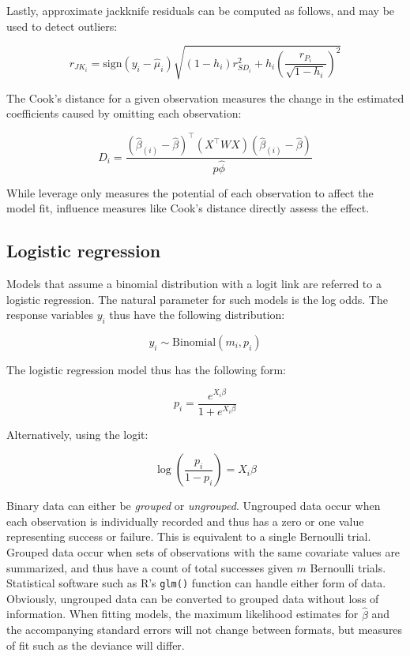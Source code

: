 \documentclass{report}
\begin{document}
Lastly, approximate jackknife residuals can be computed as follows, and may be used to detect outliers:

\begin{equation}\label{eq:glm-resid-jackknife}
    r_{JK_i} = \text{sign}(y_i - \hat{\mu}_i)\sqrt{(1-h_i)r_{SD_i}^2 + h_i\left(\frac{r_{P_i}}{\sqrt{1-h_i}}\right)^2}
\end{equation}

The Cook's distance for a given observation measures the change in the estimated coefficients caused by omitting each observation:

\begin{equation}\label{eq:glm-cooks-distance}
    D_i = \frac{\left(\hat{\beta}_{(i)} - \hat{\beta}\right)^\intercal\left(X^\intercal WX\right)\left(\hat{\beta}_{(i)} - \hat{\beta}\right)}{p\hat{\phi}}
\end{equation}

While leverage only measures the potential of each observation to affect the model fit, influence measures like Cook's distance directly assess the effect. 

\subsection{Logistic regression}

Models that assume a binomial distribution with a logit link are referred to a logistic regression. The natural parameter for such models is the log odds. The response variables $y_i$ thus have the following distribution:

\begin{equation}\label{eq:glm-logistic-resp-dist}
    y_i \sim \text{Binomial}(m_i, p_i)
\end{equation}

The logistic regression model thus has the following form:

\begin{equation}\label{eq:glm-logistic-model-1}
    p_i = \frac{e^{X_i\beta}}{1 + e^{X_i\beta}}
\end{equation}

Alternatively, using the logit:

\begin{equation}\label{eq:glm-logistic-model-2}
    \log\left(\frac{p_i}{1 - p_i}\right) = X_i\beta
\end{equation}

Binary data can either be \textit{grouped} or \textit{ungrouped}. Ungrouped data occur when each observation is individually recorded and thus has a zero or one value representing success or failure. This is equivalent to a single Bernoulli trial. Grouped data occur when sets of observations with the same covariate values are summarized, and thus have a count of total successes given $m$ Bernoulli trials. Statistical software such as R's \texttt{glm()} function can handle either form of data. Obviously, ungrouped data can be converted to grouped data without loss of information. When fitting models, the maximum likelihood estimates for $\hat{\beta}$ and the accompanying standard errors will not change between formats, but measures of fit such as the deviance will differ. 
\end{document}
